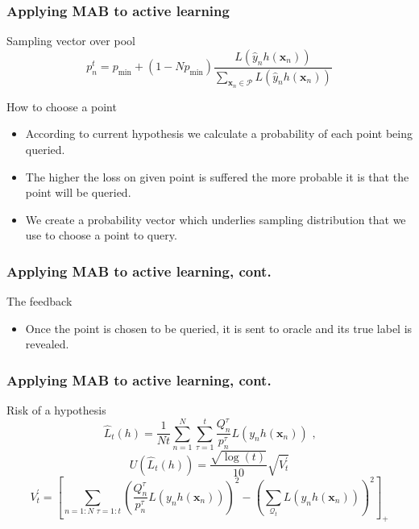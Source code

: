 \documentclass{beamer}
\begin{document}
  \begin{frame}
  \frametitle{Applying MAB to active learning}
  \begin{alertblock}{Sampling vector over pool}
    $$
    p_n^t = p_{\text{min}} + (1-Np_{\text{min}}) 
    \frac{L(\hat{y}_n h(\mathbf{x}_n))}{\sum_{\mathbf{x}_n \in \mathscr{P}} L(\hat{y}_n h(\mathbf{x}_n))}
    $$
  \end{alertblock}
  \begin{block}{How to choose a point}
    \begin{itemize}
      \item According to current hypothesis we calculate a probability of each point being queried.
      \item The higher the loss on given point is suffered the more probable it is that the point will be queried.
      \item We create a probability vector which underlies sampling distribution that we use to choose a point to query.
    \end{itemize}
  \end{block}
  \end{frame}
  \begin{frame}
  \frametitle{Applying MAB to active learning, cont.}
  \begin{block}{The feedback}
    \begin{itemize}
      \item Once the point is chosen to be queried, it is sent to oracle and its true label is revealed.
    \end{itemize}
  \end{block}
  \end{frame}
  \begin{frame}
  \frametitle{Applying MAB to active learning, cont.}
  \begin{alertblock}{Risk of a hypothesis}
  $$
  \hat{L}_t(h) = \frac{1}{Nt} \sum_{n=1}^{N} \sum_{\tau = 1}^{t} 
\frac{Q^{\tau}_n}{p^{\tau}_n} L(y_n h(\mathbf{x}_n)) \text{~,}
  $$
  $$U(\hat{L}_t(h)) = \frac{ \sqrt{ \log(t) } }
                       { 10 }
                  \sqrt{ V^\prime_t }$$
  $$V^\prime_t = \left[
  \sum_{n = 1:N \text{~} \tau = 1:t} \left( \frac{Q^\tau_n}{p^\tau_n} L(y_n h(\mathbf{x}_n)) \right)^2
  -
  \left( \sum_{\mathscr{Q}_t} L(y_n h(\mathbf{x}_n)) \right)^2
\right]_+$$
  \end{alertblock}
  \end{frame}
\end{document}
